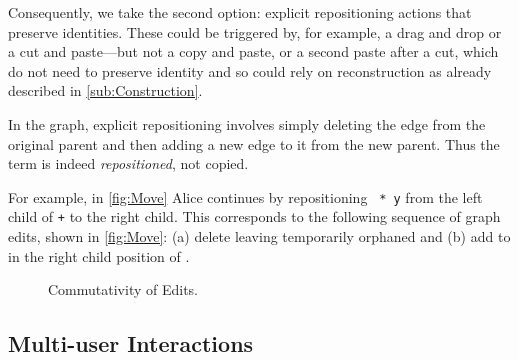 Consequently, we take the second option: explicit repositioning actions that preserve identities.
These could be triggered by, for example, a drag and drop or a cut and paste---but not a copy and paste,
or a second paste after a cut, which do not need to preserve identity
and so could rely on reconstruction as already described in \autoref{sub:Construction}.

In the graph, explicit repositioning involves simply deleting the edge from the original parent
and then adding a new edge to it from the new parent.
Thus the term is indeed \textit{repositioned}, not copied.

For example, in \autoref{fig:Move} Alice continues by
repositioning \texttt{\hole{} * y} from the left child of \texttt{+} to the right child.
This corresponds to the following sequence of graph edits, shown in \autoref{fig:Move}:
(a) delete \eWrapTimes{} leaving \vSimpleTimes{} temporarily orphaned and
(b) add \eMoveTimes{} to \vSimpleTimes{} in the right child position of \vWrapPlus{}.

\figureDifferentPartsNestedParts{}

\begin{figure}
  \centering
  \caption{Commutativity of Edits.}
  \label{fig:Commutativity}
\end{figure}

\subsection{Multi-user Interactions}%
\label{sub:Multi-user Interactions}

